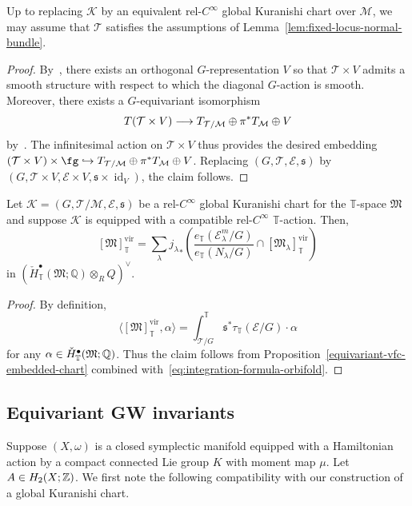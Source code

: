 \documentclass[AHL,Unicode,longabstracts]{cedram}
\newcommand{\lspan}[1]{\langle {#1}\rangle}
\newcommand{\vfc}[1]{[#1]^{\virt}}
\newcommand{\chml}{\check{H}}
\newcommand{\ucc}{^{\bullet}}
\newcommand{\dul}{^\vee}
\newcommand{\bQ}{\mathbb{Q}}
\newcommand{\bT}{\mathbb{T}}
\newcommand{\bZ}{\mathbb{Z}}
\newcommand{\cE}{\mathcal{E}}
\newcommand{\cK}{\mathcal{K}}
\newcommand{\cM}{\mathcal{M}}
\newcommand{\cT}{\mathcal{T}}
\newcommand{\fM}{\mathfrak{M}}
\newcommand{\fs}{\mathfrak{s}}
\DeclareMathOperator{\virt}{vir}
\DeclareMathOperator{\ide}{id}
\renewcommand*{\to}{\mathchoice{\longrightarrow}{\rightarrow}{\rightarrow}{\rightarrow}}
\newcommand{\longhookrightarrow}{\lhook\joinrel\longrightarrow}
\newcommand*{\hookto}{\mathchoice{\longhookrightarrow}{\hookrightarrow}{\hookrightarrow}{\hookrightarrow}}
\let\oldin\in
\renewcommand{\in}{\mathchoice{\oldin}{\oldin}{\,\oldin\,}{\,\oldin\,}}
\begin{document}
\begin{lemm}\label{lem:gkc-normal-bundle}
Up to replacing $\cK$ by an equivalent rel-$C^\infty$ global Kuranishi chart over $\cM$, we may assume that $\cT$ satisfies the assumptions of Lemma~\ref{lem:fixed-locus-normal-bundle}.
\end{lemm}

\begin{proof}
By~\cite[Theorem~3.6]{La79}, there exists an orthogonal $G$-representation $V$ so that $\cT\times V$ admits a smooth structure with respect to which the diagonal $G$-action is smooth. Moreover, there exists a $G$-equivariant isomorphism
\[
T(\cT\times V)\to T_{\cT/\cM}\oplus \pi^*T_\cM\oplus V
\]
by~\cite[Addendum~4.14]{AMS21}. The infinitesimal action on $\cT\times V$ thus provides the desired embedding $(\cT\times V)\times\fg \hookto T_{\cT/\cM}\oplus \pi^*T_\cM\oplus V$. Replacing $(G,\cT,\cE,\fs)$ by $(G,\cT\times V,\cE\times V,\fs\times\ide_V)$, the claim follows.
\end{proof}

\begin{theo}\label{Virtual Localisation}
Let $\cK= (G,\cT/\cM,\cE,\fs)$ be a rel-$C^\infty$ global Kuranishi chart for the $\bT$-space $\fM$ and suppose $\cK$ is equipped with a compatible rel-$C^\infty$ $\bT$-action. Then,
\begin{equation}\label{virt-loc}
\vfc{\fM}_\bT = \sum_{\lambda}{{j_\lambda}_*\left(\frac{e_{\bT}(\cE^m_\lambda/G)}{e_{\bT}(N_\lambda/G)}\cap \vfc{\fM_\lambda}_\bT\right)}
\end{equation}
in $(\chml\ucc_\bT(\fM;\bQ)\otimes_R Q)\dul$.
\end{theo}

\begin{proof}
By definition,
\[
\lspan{\vfc{\fM}_\bT,\alpha} = \int^\bT_{\cT/G} \fs^*\tau_\bT(\cE/G)\cdot \alpha
\]
for any $\alpha\in \chml\ucc_\bT(\fM;\bQ)$. Thus the claim follows from Proposition~\ref{equivariant-vfc-embedded-chart} combined with~\eqref{eq:integration-formula-orbifold}.
\end{proof}


\subsection{Equivariant GW invariants}\label{subsec:equiv-gw}

Suppose $(X,\omega)$ is a closed symplectic manifold equipped with a Hamiltonian action by a compact connected Lie group $K$ with moment map $\mu$. Let $A\in H_2(X;\bZ)$. We first note the following compatibility with our construction of a global Kuranishi chart.
\end{document}
